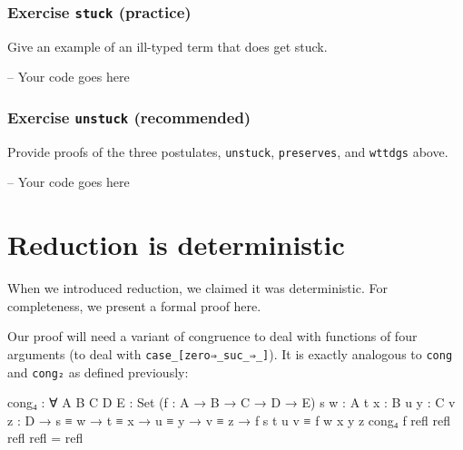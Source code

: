 \hypertarget{exercise-stuck-practice}{%
\subsubsection{\texorpdfstring{Exercise \texttt{stuck}
(practice)}{Exercise stuck (practice)}}\label{exercise-stuck-practice}}

Give an example of an ill-typed term that does get stuck.

\begin{fence}
\begin{code}
-- Your code goes here
\end{code}
\end{fence}

\hypertarget{exercise-unstuck-recommended}{%
\subsubsection{\texorpdfstring{Exercise \texttt{unstuck}
(recommended)}{Exercise unstuck (recommended)}}\label{exercise-unstuck-recommended}}

Provide proofs of the three postulates, \texttt{unstuck},
\texttt{preserves}, and \texttt{wttdgs} above.

\begin{fence}
\begin{code}
-- Your code goes here
\end{code}
\end{fence}

\hypertarget{reduction-is-deterministic}{%
\section{Reduction is deterministic}\label{reduction-is-deterministic}}

When we introduced reduction, we claimed it was deterministic. For
completeness, we present a formal proof here.

Our proof will need a variant of congruence to deal with functions of
four arguments (to deal with
\texttt{case\_{[}zero⇒\_\textbar{}suc\_⇒\_{]}}). It is exactly analogous
to \texttt{cong} and \texttt{cong₂} as defined previously:

\begin{fence}
\begin{code}
cong₄ : ∀ {A B C D E : Set} (f : A → B → C → D → E)
  {s w : A} {t x : B} {u y : C} {v z : D}
  → s ≡ w → t ≡ x → u ≡ y → v ≡ z → f s t u v ≡ f w x y z
cong₄ f refl refl refl refl = refl
\end{code}
\end{fence}


